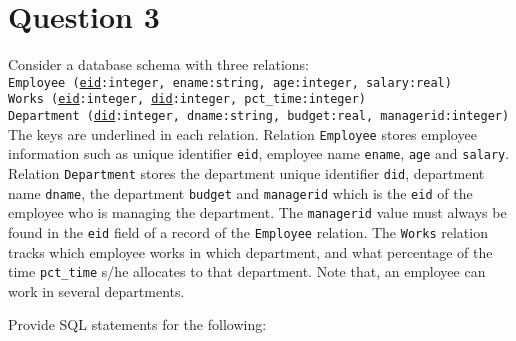 
\section*{Question 3}

Consider a database schema with three relations:\\

\texttt{Employee (\underline{eid}:integer, ename:string, age:integer, salary:real)}\\
\texttt{Works (\underline{eid}:integer, \underline{did}:integer, pct\_time:integer)}\\
\texttt{Department (\underline{did}:integer, dname:string, budget:real, managerid:integer)}\\

The keys are underlined in each relation. Relation \texttt{Employee} stores employee information such as unique identifier \texttt{eid}, employee name \texttt{ename}, \texttt{age} and \texttt{salary}. Relation \texttt{Department} stores the department unique identifier \texttt{did}, department name \texttt{dname}, the department \texttt{budget} and \texttt{managerid} which is the \texttt{eid} of the employee who is managing the department. The \texttt{managerid} value must always be found in the \texttt{eid} field of a record of the \texttt{Employee} relation. The \texttt{Works} relation tracks which employee works in which department, and what percentage of the time \texttt{pct\_time} s/he allocates to that department. Note that, an employee can work in several departments.

Provide SQL statements for the following:

